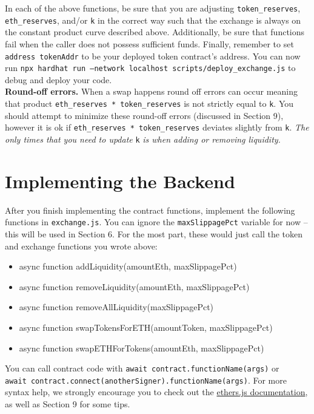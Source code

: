 \documentclass[11pt]{article}
\begin{document}
In each of the above functions, be sure that you are adjusting \texttt{token\_reserves}, \texttt{eth\_reserves}, and/or \texttt{k} in the correct way such that the exchange is always on the constant product curve described above. Additionally, be sure that functions fail when the caller does not possess sufficient funds. Finally, remember to set \texttt{address tokenAddr} to be your deployed token contract's address. You can now run \texttt{npx hardhat run --network localhost scripts/deploy\_exchange.js} to debug and deploy your code. \\

    \textbf{Round-off errors.} When a swap happens round off errors can occur meaning that product \texttt{eth\_reserves * token\_reserves} is not strictly equal to \texttt{k}. You should attempt to minimize these round-off errors (discussed in Section 9), however it is ok if \texttt{eth\_reserves * token\_reserves} deviates slightly from \texttt{k}. \textit{The only times that you need to update} \texttt{k} \textit{is when adding or removing liquidity.}

\section{Implementing the Backend}
After you finish implementing the contract functions, implement the following functions in \texttt{exchange.js}. You can ignore the \texttt{maxSlippagePct} variable for now -- this will be used in Section 6. For the most part, these would just call the token and exchange functions you wrote above:
\begin{itemize}
    \item async function addLiquidity(amountEth, maxSlippagePct)
    \item async function removeLiquidity(amountEth, maxSlippagePct)
    \item async function removeAllLiquidity(maxSlippagePct)
    \item async function swapTokensForETH(amountToken, maxSlippagePct)
    \item async function swapETHForTokens(amountEth, maxSlippagePct)
\end{itemize}

You can call contract code with \texttt{await contract.functionName(args)} or \\ \texttt{await contract.connect(anotherSigner).functionName(args)}. For more syntax help, we strongly encourage you to check out the \hyperlink{https://docs.ethers.io/v5/getting-started/}{ethers.js documentation}, as well as Section 9 for some tips.
\end{document}
